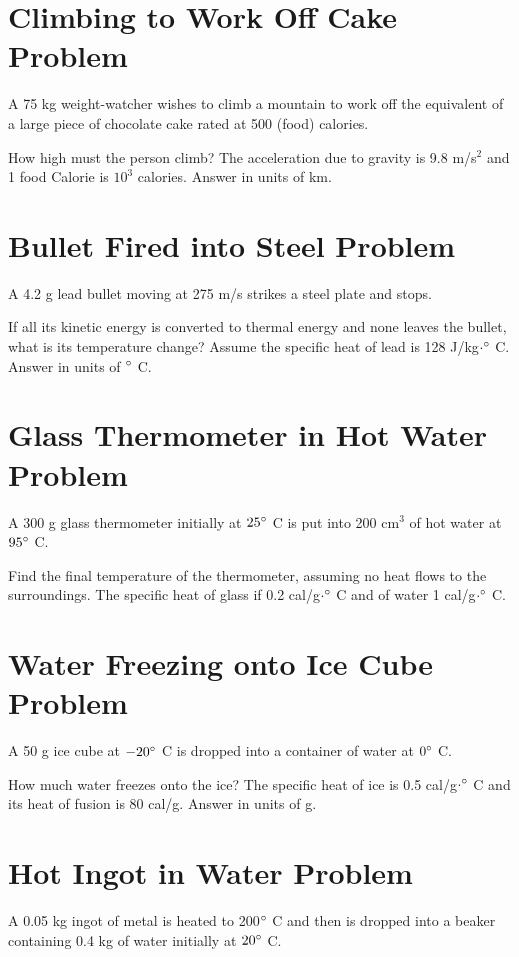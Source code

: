 \documentclass[../physics12.tex]{subfiles}
\begin{document}
\section{Climbing to Work Off Cake Problem}
A 75 kg weight-watcher wishes to climb a mountain to work off the equivalent of a large piece of chocolate cake rated at 500 (food) calories.

How high must the person climb? The acceleration due to gravity is 9.8 m/s$^2$ and 1 food Calorie is $10^3$ calories. Answer in units of km.

\section{Bullet Fired into Steel Problem}
A 4.2 g lead bullet moving at 275 m/s strikes a steel plate and stops.

If all its kinetic energy is converted to thermal energy and none leaves the bullet, what is its temperature change? Assume the specific heat of lead is 128 J/kg$\cdot\degree$ C. Answer in units of $\degree$ C.

\section{Glass Thermometer in Hot Water Problem}
A 300 g glass thermometer initially at $25\degree$ C is put into 200 cm$^3$ of hot water at $95\degree$ C. 

Find the final temperature of the thermometer, assuming no heat flows to the surroundings. The specific heat of glass if 0.2 cal/g$\cdot\degree$ C and of water 1 cal/g$\cdot\degree$ C.

\section{Water Freezing onto Ice Cube Problem}
A 50 g ice cube at $-20\degree$ C is dropped into a container of water at $0\degree$ C.

How much water freezes onto the ice? The specific heat of ice is 0.5 cal/g$\cdot\degree$ C and its heat of fusion is 80 cal/g. Answer in units of g.

\section{Hot Ingot in Water Problem}
A 0.05 kg ingot of metal is heated to 200$\degree$ C and then is dropped into a beaker containing 0.4 kg of water initially at $20\degree$ C.
\end{document}
